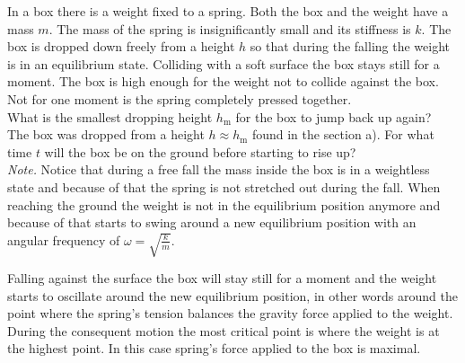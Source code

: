 {\fi


\ifEngStatement
In a box there is a weight fixed to a spring. Both the box and the weight have a mass $m$. The mass of the spring is insignificantly small and its stiffness is $k$. The box is dropped down freely from a height $h$ so that during the falling the weight is in an equilibrium state. Colliding with a soft surface the box stays still for a moment. The box is high enough for the weight not to collide against the box. Not for one moment is the spring completely pressed together.\\
\osa What is the smallest dropping height $h_\text{m}$ for the box to jump back up again?\\
\osa The box was dropped from a height $h\approx h_\text{m}$ found in the section a). For what time $t$ will the box be on the ground before starting to rise up?\\
\emph{Note.} Notice that during a free fall the mass inside the box is in a weightless state and because of that the spring is not stretched out during the fall. When reaching the ground the weight is not in the equilibrium position anymore and because of that starts to swing around a new equilibrium position with an angular frequency of $\omega =\sqrt{\frac{k}{m}}$.
\fi


\ifEngHint
Falling against the surface the box will stay still for a moment and the weight starts to oscillate around the new equilibrium position, in other words around the point where the spring’s tension balances the gravity force applied to the weight. During the consequent motion the most critical point is where the weight is at the highest point. In this case spring’s force applied to the box is maximal.
\fi


}
